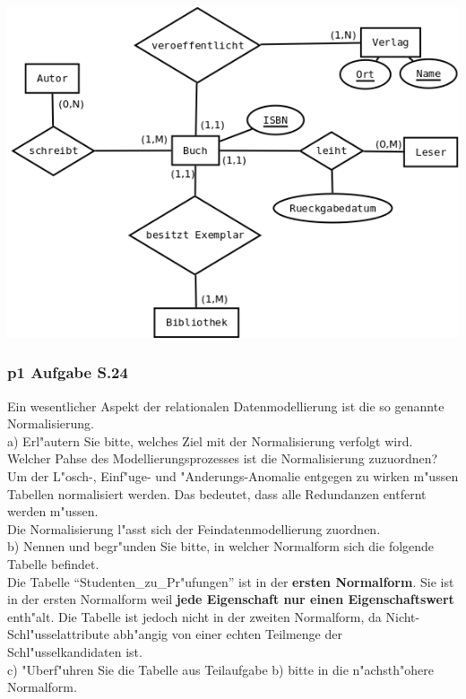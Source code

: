\includegraphics[scale=0.5]{./inc/p1_umlaufgabe}


\subsubsection{p1 Aufgabe S.24}
Ein wesentlicher Aspekt der relationalen Datenmodellierung ist die so genannte Normalisierung.\\
a) Erl"autern Sie bitte, welches Ziel mit der Normalisierung verfolgt wird.
Welcher Pahse des Modellierungsprozesses ist die Normalisierung zuzuordnen?\\

Um der L"osch-, Einf"uge- und "Anderungs-Anomalie entgegen zu wirken m"ussen Tabellen normalisiert werden.
Das bedeutet, dass alle Redundanzen entfernt werden m"ussen.\\
Die Normalisierung l"asst sich der Feindatenmodellierung zuordnen.\\

b) Nennen und begr"unden Sie bitte, in welcher Normalform sich die folgende Tabelle befindet.\\

Die Tabelle "`Studenten\_zu\_Pr"ufungen"' ist in der \textbf{ersten Normalform}.
Sie ist in der ersten Normalform weil \textbf{jede Eigenschaft nur einen Eigenschaftswert} enth"alt.
Die Tabelle ist jedoch nicht in der zweiten Normalform, da Nicht-Schl"usselattribute abh"angig von einer echten Teilmenge der Schl"usselkandidaten ist.\\

c) "Uberf"uhren Sie die Tabelle aus Teilaufgabe b) bitte in die n"achsth"ohere Normalform.\\


